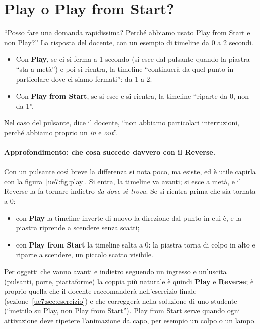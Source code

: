 \section{Play o Play from Start?}
\label{ue7:sec:play}

``Posso fare una domanda rapidissima? Perché abbiamo usato Play from Start e non
Play?'' La risposta del docente, con un esempio di timeline da 0 a 2 secondi.
\begin{itemize}
  \item Con \textbf{Play}, se ci si ferma a 1 secondo (si esce dal pulsante quando la
        piastra ``sta a metà'') e poi si rientra, la timeline ``continuerà da quel punto
        in particolare dove ci siamo fermati'': da 1 a 2.
  \item Con \textbf{Play from Start}, se si esce e si rientra, la timeline ``riparte da
        0, non da 1''.
\end{itemize}
Nel caso del pulsante, dice il docente, ``non abbiamo particolari interruzioni, perché
abbiamo proprio un \emph{in} e \emph{out}''.

\paragraph{Approfondimento: che cosa succede davvero con il Reverse.} Con un pulsante
così breve la differenza si nota poco, ma esiste, ed è utile capirla con la
figura~\ref{ue7:fig:play}. Si entra, la timeline va avanti; si esce a metà, e il Reverse
la fa tornare indietro \emph{da dove si trova}. Se si rientra prima che sia tornata a 0:
\begin{itemize}
  \item con \textbf{Play} la timeline inverte di nuovo la direzione dal punto in cui è,
        e la piastra riprende a scendere senza scatti;
  \item con \textbf{Play from Start} la timeline salta a 0: la piastra torna di colpo in
        alto e riparte a scendere, un piccolo scatto visibile.
\end{itemize}
Per oggetti che vanno avanti e indietro seguendo un ingresso e un'uscita (pulsanti,
porte, piattaforme) la coppia più naturale è quindi \textbf{Play} e \textbf{Reverse}; è
proprio quella che il docente raccomanderà nell'esercizio finale
(sezione~\ref{ue7:sec:esercizio}) e che correggerà nella soluzione di uno studente
(``mettilo su Play, non Play from Start''). Play from Start serve quando ogni attivazione
deve ripetere l'animazione da capo, per esempio un colpo o un lampo.


